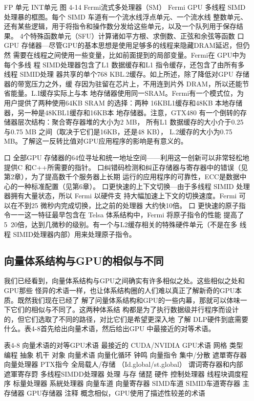 FP 单元
INT单元
图 4-14
Fermi流式多处理器（SM）
Fermi GPU 多线程 SIMD处理暴的框图。每个 SIMD 车道有一个流水线浮点单元、一个流水线
整数单元、还有某些逻辑，用于将指令和操作数分发给这些单元，以及一个队列用于保存结果。
4个特殊函数单元（SFU）计算诸如平方根、求倒数、正弦和余弦等函数
口 GPU 存储器—尽管GPU的基本思想是使用足够多的线程来隐藏DRAM延迟，但仍然
需要在线程之间使用一些变量，比如前面提到的局部变量。Fermi在 GPU中为每个多线
程 SIMD处理器包含了L1 数据缓存和L1 指令缓存，还包含了由所有多线程 SIMID处理
器共享的单个768 KBL.2缓存。如上所述，除了降低对GPU 存储器的带宽压力之外，缓
存因为驻留在芯片上，不用连到片外 DRAM，所以还能节省能量。L.I缓存实际上与本
地存储器使用同一SRAM。Fermi有一个模式位，为用户提供了两种使用64KB SRAM
的选择：两种 16KBL1缓存和48KB 本地存储器，另一种是48KBL1缓存和16KB本
地存储器。注意，GTX480 有一个倒转的存储器层次结构：聚合寄存器堆的大小为2 MB，
所有L1 数据缓存的大小介于0.25与0.75 MB 之间（取决于它们是16KB，还是48 KB），
L.2缓存的大小为0.75 MB。了解这一反转比值对GPU应用程序的影响是有意义的。

口 全部GPU 存储器的64位寻址和统一地址空间——利用这一创新可以非常轻松地提供C
和C++所需要的指针。
口纠错码检测和纠正存储器与寄存器中的错误（见第2章），为了提高数千个服务器上长期
运行的应用程序的可靠性，ECC是数据中心的一种标准配置（见第6章）。
口更快速的上下文切换—由于多线程 SIMID 处理器拥有大量状态，所以 Fermi 以硬件支
持大幅加速上下文的切换速度。Fermi 可以在不到25 微秒内完成切换，比之前的处理器
大约快10倍。
口 更快速的原子指令一一这一特征最早包含在 Telsa 体系结构中，Fermi 将原子指令的性能
提高了5~20倍，达到几微秒的级别。有一个与L2缓存相关的特殊硬件单元（不是在多
线程 SIMID处理器内部）用来处理原子指令。

\subsection{向量体系结构与GPU的相似与不同}
我们已经看到，向量体系结构与GPU之间确实有许多相似之处。这些相似之处和GPU那些
怪异的术语一样，也让体系结构圈的人们难以真正了解新奇的GPU本质。既然我们现在已经了
解了问量体系结构和GPU的一些内幕，那就可以体味一下它们的相似与不同了。这两种体系结
构都是为了执行数据级并行程序而设计的，但它们选取了不同的路径，对比它们是希望更深入地
了解 DLP硬件到底需要什么。表4-8首先给出向量术语，然后给出GPU 中最接近的对等术语。

表4-8
向量术语的对等GPU术语
最接近的
CUDA/NVIDIA
GPU术语
网格
类型
编程
抽象
机干
对象
向量术语
向量化循环
钟鸣
向量指令
集中/分散
遮單寄存器
向量处理器
PTX指今
全局载人/存储
（Id.global/st.global）
谓词寄存器和内部
遮軍寄存罸
多线程SIMDD处理器
处理
与存
储琵
硬件
控制处理器
线程块调度程序
标量处理器
系絖处理器
向量车道
向量寄存器
SIMD车道
SIMID车道寄存器
主存储器
GPU存储器
注释
概念相似，GPU使用了描述性较差的术语

